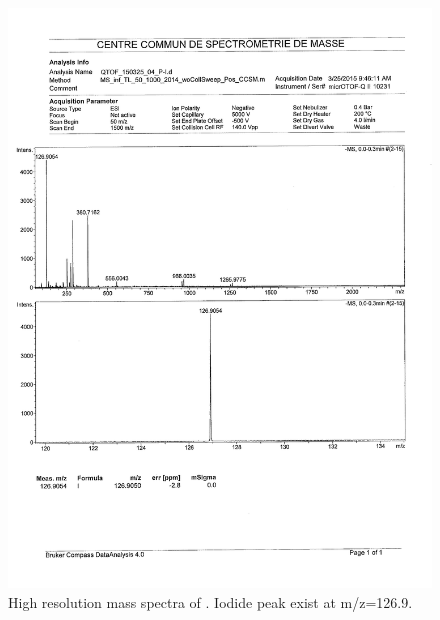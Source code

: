 \documentclass[journal=jacsat,manuscript=article]{achemso}
\begin{document}
\begin{figure}
\includegraphics[height=\textheight-2\baselineskip]{mass_PImI.png}
\caption{High resolution mass spectra of . Iodide peak exist at m/z=126.9.}
\label{fig:massPImI}
\end{figure}
\end{document}
